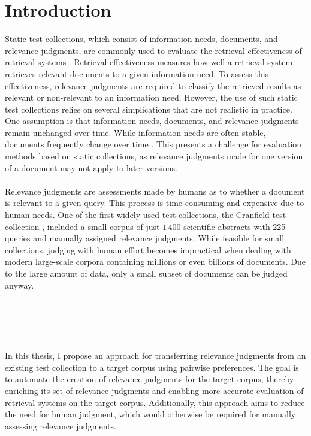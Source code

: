 \chapter{Introduction}\label{introduction} 

Static test collections, which consist of information needs, documents, and relevance judgments, are commonly used to evaluate the retrieval effectiveness of retrieval systems \citep{sanderson:2010}. Retrieval effectiveness measures how well a retrieval system retrieves relevant documents to a given information need. To assess this effectiveness, relevance judgments are required to classify the retrieved results as relevant or non-relevant to an information need. However, the use of such static test collections relies on several simplications that are not realistic in practice. One assumption is that information needs, documents, and relevance judgments remain unchanged over time. While information needs are often stable, documents frequently change over time \mbox{\citep{cho:2000}}. This presents a challenge for evaluation methods based on static collections, as relevance judgments made for one version of a document may not apply to later versions.
\\\\
Relevance judgments are assessments made by humans as to whether a document is relevant to a given query. This process is time-consuming and expensive due to human needs. One of the first widely used test collections, the Cranfield test collection \mbox{\citep{cleverdon:91}}, included a small corpus of just $1\,400$ scientific abstracts with 225 queries and manually assigned relevance judgments. While feasible for small collections, judging with human effort becomes impractical when dealing with modern large-scale corpora containing millions or even billions of documents. Due to the large amount of data, only a small subset of documents can be judged anyway. 
\\\\\\\\\\\\
In this thesis, I propose an approach for transferring relevance judgments from an existing test collection to a target corpus using pairwise preferences. The goal is to automate the creation of relevance judgments for the target corpus, thereby enriching its set of relevance judgments and enabling more accurate evaluation of retrieval systems on the target corpus. Additionally, this approach aims to reduce the need for human judgment, which would otherwise be \mbox{required} for manually assessing relevance judgments.
